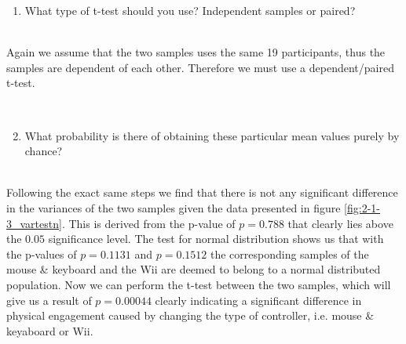 \noindent\colorbox{lighter-gray}{\begin{minipage}{0.98\textwidth}
\begin{enumerate}[label=\textbf{(\arabic*)}]\setcounter{enumi}{0}
	\item What type of t-test should you use? Independent samples or paired?
\end{enumerate}\end{minipage}}

\hspace{0pt} \\
Again we assume that the two samples uses the same 19 participants, thus the samples are dependent of each other. Therefore we must use a dependent/paired t-test.

\hspace{0pt} \\
\noindent\colorbox{lighter-gray}{\begin{minipage}{0.98\textwidth}
\begin{enumerate}[label=\textbf{(\arabic*)}]\setcounter{enumi}{1}
	\item What probability is there of obtaining these particular mean values purely by chance?
\end{enumerate}\end{minipage}}

\hspace{0pt} \\
Following the exact same steps we find that there is not any significant difference in the variances of the two samples given the data presented in figure \ref{fig:2-1-3_vartestn}. This is derived from the p-value of $p=0.788$ that clearly lies above the $0.05$ significance level. The test for normal distribution shows us that with the p-values of $p=0.1131$ and $p=0.1512$ the corresponding samples of the mouse \& keyboard and the Wii are deemed to belong to a normal distributed population.
Now we can perform the t-test between the two samples, which will give us a result of $p=0.00044$ clearly indicating a significant difference in physical engagement caused by changing the type of controller, i.e. mouse \& keyaboard or Wii.


